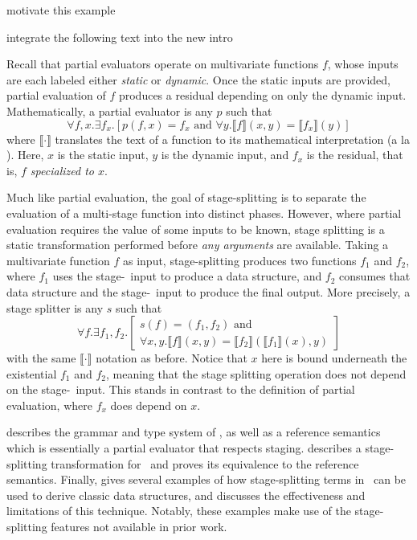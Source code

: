 \TODO motivate this example

\TODO integrate the following text into the new intro

Recall that partial evaluators operate on multivariate functions $f$, whose
inputs are each labeled either {\em static} or {\em dynamic}. Once the static
inputs are provided, partial evaluation of $f$ produces a residual depending on
only the dynamic input. Mathematically, a partial evaluator is any $p$ such
that
\[
	\forall f,x. \exists f_x. \left[p(f,x) = f_x \text{ and } \forall y.\llbracket f \rrbracket(x,y)=\llbracket f_x \rrbracket(y)\right]
\]
where $\llbracket \cdot \rrbracket$ translates the text of a function to its
mathematical interpretation (a la \cite{jones96}). Here, $x$ is the static
input, $y$ is the dynamic input, and $f_x$ is the residual, that is, \emph{$f$
specialized to $x$}.


Much like partial evaluation, the goal of stage-splitting is to separate the evaluation of a multi-stage function into distinct phases.
However, where partial evaluation requires the value of some inputs to be known, stage splitting is a static transformation performed
before {\em any arguments} are available.
Taking a multivariate function $f$ as input, stage-splitting produces two functions $f_1$ and $f_2$,
where $f_1$ uses the stage-\bbone\ input to produce a data structure, 
and $f_2$ consumes that data structure and the stage-\bbtwo\ input to produce the final output.  
More precisely, a stage splitter is any $s$ such that
\[
	\forall f. \exists f_1,f_2. 
	\left[
		\begin{array}{l}
		s(f) = (f_1,f_2) \text{ and } \\
		\forall x,y.\llbracket f \rrbracket(x,y)=\llbracket f_2 \rrbracket(\llbracket f_1 \rrbracket(x),y)
		\end{array}
	\right]
\]
with the same $\llbracket \cdot \rrbracket$ notation as before.
Notice that $x$ here is bound underneath the existential $f_1$ and $f_2$,
meaning that the stage splitting operation does not depend on the stage-\bbone\ input.
This stands in contrast to the definition of partial evaluation, where $f_x$ does depend on $x$.




 describes the grammar and type system of \lang, as well as a reference semantics which is essentially a partial evaluator that respects staging.  describes a stage-splitting transformation for \lang\ and proves its equivalence to the reference semantics.
Finally,  gives several examples of how stage-splitting terms in \lang\ can be used to derive classic data structures, and discusses the effectiveness and limitations of this technique.  Notably, these examples make use of the stage-splitting features not available in prior work.


